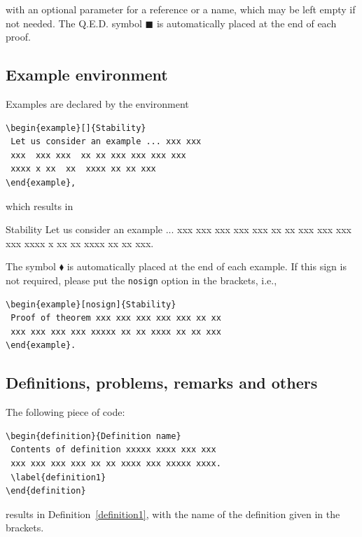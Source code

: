 \documentclass{amcs}
\begin{document}
\medskip

\noindent with an optional parameter for a reference or a name, which may be left empty if not needed. The Q.E.D. symbol {\footnotesize $\blacksquare$} is automatically placed at the end of each proof.

\subsection{Example environment}
Examples are declared by the environment
{\small \begin{verbatim}
\begin{example}[]{Stability}
 Let us consider an example ... xxx xxx
 xxx  xxx xxx  xx xx xxx xxx xxx xxx
 xxxx x xx  xx  xxxx xx xx xxx
\end{example},
\end{verbatim}}

\noindent which results in

\begin{example}[]{Stability}
 Let us consider an example ... xxx xxx
 xxx xxx xxx  xx xx xxx xxx xxx xxx xxxx
 x xx xx  xxxx xx xx xxx.
\end{example}

\medskip \noindent The symbol $\blacklozenge$ is automatically placed at the end of each example. If this sign is not required, please put the \texttt{nosign} option in the brackets, i.e.,

{\small \begin{verbatim}
\begin{example}[nosign]{Stability}
 Proof of theorem xxx xxx xxx xxx xxx xx xx
 xxx xxx xxx xxx xxxxx xx xx xxxx xx xx xxx
\end{example}.
\end{verbatim}}

\subsection{Definitions, problems, remarks and others}

The following piece of code:

{\small \begin{verbatim}
\begin{definition}{Definition name}
 Contents of definition xxxxx xxxx xxx xxx
 xxx xxx xxx xxx xx xx xxxx xxx xxxxx xxxx.
 \label{definition1}
\end{definition}
\end{verbatim}}
\noindent results in Definition~\ref{definition1}, with the name of the definition given in the brackets.
\end{document}

